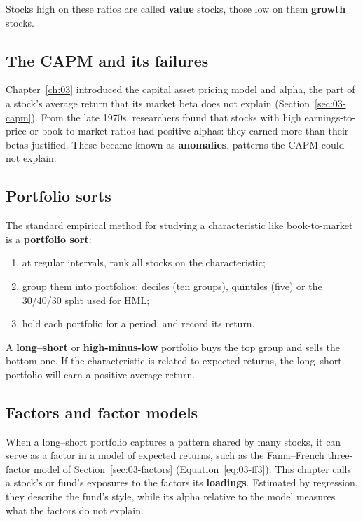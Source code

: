 Stocks high on these ratios are called \textbf{value} stocks, those low on them \textbf{growth} stocks.

\subsection{The CAPM and its failures}

Chapter~\ref{ch:03} introduced the capital asset pricing model and alpha, the part of a stock's average return that its market beta does not explain (Section~\ref{sec:03-capm}). From the late 1970s, researchers found that stocks with high earnings-to-price or book-to-market ratios had positive alphas: they earned more than their betas justified. These became known as \textbf{anomalies}, patterns the CAPM could not explain.

\subsection{Portfolio sorts}

The standard empirical method for studying a characteristic like book-to-market is a \textbf{portfolio sort}:

\begin{enumerate}
  \item at regular intervals, rank all stocks on the characteristic;
  \item group them into portfolios: deciles (ten groups), quintiles (five) or the 30/40/30 split used for HML;
  \item hold each portfolio for a period, and record its return.
\end{enumerate}

A \textbf{long--short} or \textbf{high-minus-low} portfolio buys the top group and sells the bottom one. If the characteristic is related to expected returns, the long--short portfolio will earn a positive average return.

\subsection{Factors and factor models}

When a long--short portfolio captures a pattern shared by many stocks, it can serve as a factor in a model of expected returns, such as the Fama--French three-factor model of Section~\ref{sec:03-factors} (Equation~\eqref{eq:03-ff3}). This chapter calls a stock's or fund's exposures to the factors its \textbf{loadings}. Estimated by regression, they describe the fund's style, while its alpha relative to the model measures what the factors do not explain.

